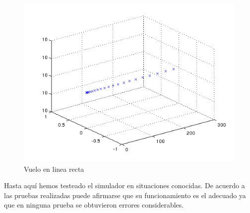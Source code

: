\documentclass[main]{subfiles}
\begin{document}
\begin{figure}[h!]
	\centering
	\includegraphics[width=1\textwidth]{./pics_simulador/recta.png}
	\caption{Vuelo en linea recta}
	\label{fig:recta}
\end{figure}

Hasta aqu\'i hemos testeado el simulador en situaciones conocidas. De acuerdo a las pruebas realizadas puede afirmarse que su funcionamiento es el adecuado ya que en ninguna prueba se obtuvieron errores considerables. 
\end{document}
